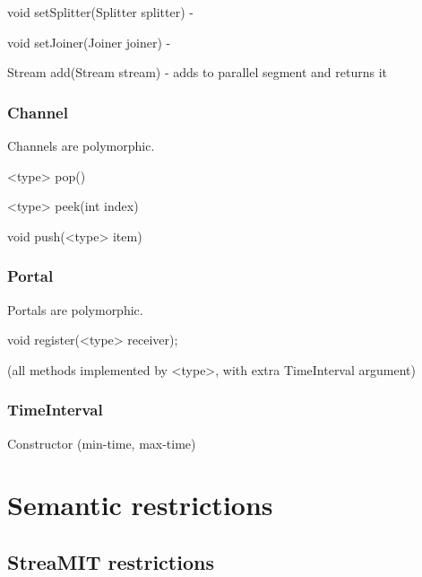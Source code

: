 void setSplitter(Splitter splitter) - 

void setJoiner(Joiner joiner) - 

Stream add(Stream stream) - adds to parallel segment and returns it

\subsubsection{Channel}

Channels are polymorphic.

<type> pop()

<type> peek(int index)

void push(<type> item)

\subsubsection{Portal}

Portals are polymorphic.

void register(<type> receiver);

(all methods implemented by <type>, with extra TimeInterval argument)

\subsubsection{TimeInterval}

Constructor (min-time, max-time)

\section{Semantic restrictions}

\subsection{StreaMIT restrictions}

